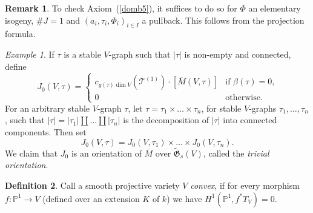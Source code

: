 \documentclass[11pt]{amsart}
\newtheorem{prop}{Proposition}[section]
\theoremstyle{definition}
\newtheorem{defn}[prop]{Definition}
\newtheorem{numrmk}[prop]{Remark}
\theoremstyle{remark}
\newtheorem{example}{Example}\renewcommand{\theexample}{}
\newenvironment{pf}{\begin{proof}}{\end{proof}}
\newcommand{\noprint}[1]{}
\renewcommand{\tilde}{\widetilde}
\newcommand{\upst}{^{\ast}}
\newcommand{\lst}{_{\ast}}
\newcommand{\GG}{{\mathfrak{G}}}
\newcommand{\pp}{{\mathbb{P}}}
\newcommand{\tT}{{\mathcal{T}}}
\newcommand{\ol}{\overline}
\theoremstyle{plain}
\theoremstyle{definition}
\theoremstyle{remark}
\begin{document}
\begin{numrmk} \label{afmsl}
To check Axiom~(\ref{domb5}), it suffices to do so for \(\Phi\) an elementary
isogeny, \(\#J=1\) and
\((a_i,\tau_i,\Phi_i)_{i\in I}\) a pullback. This follows from the projection
formula.
\end{numrmk}

\begin{example}
If \(\tau\) is a stable \(V\)-graph such that \(|\tau|\) is non-empty and connected,
define
\[
J_0(V,\tau)=
\begin{cases}
c_{g(\tau)\dim V}(\tT^{(1)})\cdot[\ol{M}(V,\tau)] & \text{if \(\beta(\tau)=0\),}
\\
0                                                 & \text{otherwise.}
\end{cases}
\]
For an arbitrary stable \(V\)-graph \(\tau\), let
\(\tau=\tau_1\times\ldots\times\tau_n\), for stable \(V\)-graphs
\(\tau_1,\ldots,\tau_n\), such that \(|\tau|=|\tau_1|\amalg\ldots\amalg|\tau_n|\)
is the decomposition of \(|\tau|\) into
connected components. Then set
\[
J_0(V,\tau)=J_0(V,\tau_1)\times\ldots\times J_0(V,\tau_n).
\]
We claim that \(J_0\) is an orientation of \(\ol{M}\) over \(\tilde{\GG}_s(V)\),
called the {\em trivial orientation}.
\end{example}

\begin{defn}
Call a smooth projective variety \(V\) {\em convex}, if for every morphism
\(f:\pp^1\rightarrow V\) (defined over an
extension \(K\) of \(k\)) we have \(H^1(\pp^1,f\upst T_V)=0\).
\end{defn}

\noprint{
\begin{prop}
Let \(\pi:C\rightarrow T\) be a prestable curve of genus zero and \(f:C\rightarrow
V\) a morphism to a convex variety. Then
\(R^1\pi\lst f\upst T_V=0\).
\end{prop}
\begin{pf}
\end{pf}
}
\end{document}
